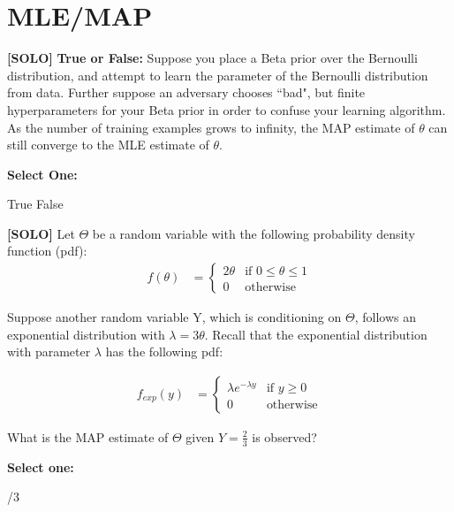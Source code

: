\documentclass[11pt,addpoints,answers]{exam}
\newcommand{\solo}{\textbf{[SOLO]} }
\begin{document}
\section{MLE/MAP}
\begin{questions}

    \question[3] \solo \textbf{True or False:} Suppose you place a Beta prior over the Bernoulli distribution, and attempt to learn the parameter of the Bernoulli distribution from data. Further suppose an adversary chooses ``bad", but finite hyperparameters for your Beta prior in order to confuse your learning algorithm. As the number of training examples grows to infinity, the MAP estimate of $\theta$ can still converge to the MLE estimate of $\theta$.
    
    \textbf{Select One:}
    
    \begin{checkboxes}
        \CorrectChoice True
        \choice False
    \end{checkboxes}
    
    
    \question[3] \solo Let $\Theta$ be a random variable with the following probability density function (pdf): 
    \begin{align*}
        f(\theta) &= 
        \begin{cases}
        2\theta  & \text{if } 0 \leq \theta \leq 1 \\
        0  & \text{otherwise}
        \end{cases}
    \end{align*}
    
    Suppose another random variable Y, which is conditioning on $\Theta$, follows an exponential distribution with  $\lambda=3\theta$. Recall that the exponential distribution with parameter $\lambda$ has the following pdf:
    
    
    \begin{align*}
        f_{exp}(y) &= 
        \begin{cases}
        \lambda e^{-\lambda y}  & \text{if } y\geq 0 \\
        0  & \text{otherwise}
        \end{cases}
    \end{align*}
    
    What is the MAP estimate of $\Theta$ given $Y=\frac{2}{3}$ is observed?

    \textbf{Select one:}
    \begin{checkboxes}
        /3
    \end{checkboxes}
    

\end{questions}
\end{document}
